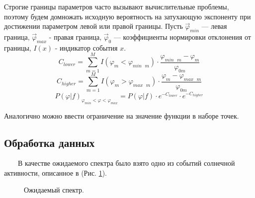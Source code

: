 \documentclass{config}
\begin{document}
Строгие границы параметров часто вызывают вычислительные проблемы, поэтому будем домножать исходную вероятность на затухающую экспоненту при достижении параметром левой или правой границы. Пусть $\vec{\varphi}_{min}$ --- левая граница,  $\vec{\varphi}_{max}$ - правая граница, $\vec{\varphi}_0$ --- коэффициенты нормировки отклонения от границы, $I(x)$ - индикатор события $x$.
\begin{equation}
    C_{lower} = \sum_{m=1}^M I(\varphi_m < \varphi_{min\text{ }m}) \cdot \frac{\varphi_{min\text{ }m} - \varphi_m}{\varphi_{0 m}}
\end{equation}
\begin{equation}
    C_{higher} = \sum_{m=1}^M I(\varphi_m > \varphi_{max\text{ }m}) \cdot \frac{\varphi_{m} - \varphi_{max\text{ }m}}{\varphi_{0 m}}
\end{equation}
\begin{equation}
    P(\varphi | f)_{\varphi_{min} <\varphi < \varphi_{max}}  = P(\varphi | f) \cdot
e^{- C_{lower}} \cdot e^{- C_{higher}}
\end{equation}

Аналогично можно ввести ограничение на значение функции в наборе точек.

\subsection{Обработка данных}
~~~~В качестве ожидаемого спектра было взято одно из событий солнечной активности, описанное в \cite{real_energy_spectrum} (Рис. \ref{real_spectrum_plot}).

\begin{figure}[h!]
    \caption{Ожидаемый спектр.}
    \label{real_spectrum_plot}
\end{figure}
\end{document}

